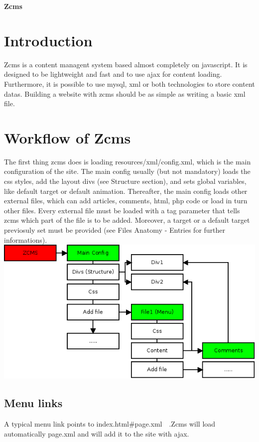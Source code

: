 \documentclass[a4paper,12pt]{article}
\begin{document}
\begin{center}
 \huge \bfseries {Zcms}
\\[0.5cm]
\end{center}
\tableofcontents
\newpage
\section{Introduction}
Zcms is a content managent system based almost completely on javascript. It is designed to be lightweight and fast and to use ajax for content loading. Furthermore, it is possible to use mysql, xml or both technologies to store content datas. Building a website with zcms should be as simple as writing a basic xml file.
\section{Workflow of Zcms}
The first thing zcms does is loading resources/xml/config.xml, which is the main configuration of the site. The main config usually (but not mandatory) loads the css styles, add the layout divs (see Structure section), and sets global variables, like default target or default animation. Thereafter, the main config loads other external files, which can add articles, comments, html, php code or load in turn other files. Every external file must be loaded with a tag parameter that tells zcms which part of the file is to be added. Moreover, a target or a default target previosuly set must be provided (see Files Anatomy - Entries for further informations).
\includegraphics[scale=0.7]{Diagramma_zcms.png} 
\subsection{Menu links}
A typical menu link points to index.html\#page.xml\ \ .Zcms will load automatically page.xml and will add it to the site with ajax.
\end{document}
